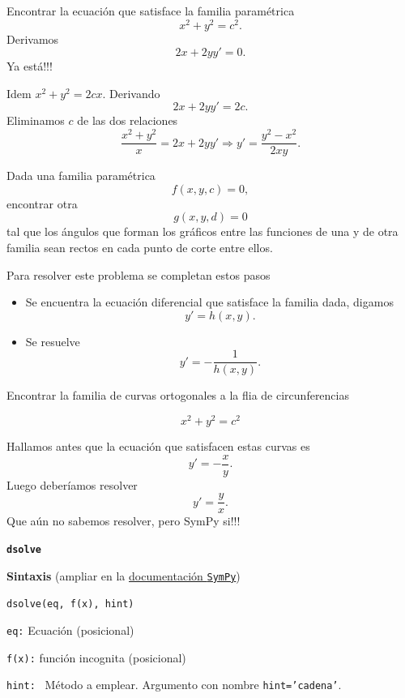 \begin{ejemplo}{} Encontrar la ecuación que satisface la familia paramétrica
\[x^2+y^2=c^2.\]
Derivamos
\[2x+2yy'=0.\]
Ya está!!!
\end{ejemplo}

\begin{ejemplo}{} Idem $x^2+y^2=2cx$.  Derivando
\[2x+2yy'=2c.\]
Eliminamos $c$ de las dos relaciones
\[\frac{x^2+y^2}{x}=2x+2yy'\Rightarrow \boxed{y'=\frac{y^2-x^2}{2xy}}.\]
\end{ejemplo}

\begin{mdframed}[style=MiEstilo]\relax%
 Dada una familia paramétrica
 \[f(x,y,c)=0,\]
 encontrar otra
 \[g(x,y,d)=0\]
 tal que los ángulos que forman los gráficos entre las funciones de una y de otra familia sean rectos  en cada punto de corte entre ellos.
\end{mdframed}




Para resolver este problema se completan estos pasos
\begin{itemize}
 \item Se encuentra la ecuación diferencial que satisface la familia dada, digamos
 \[y'=h(x,y).\]
 \item Se resuelve
 \[y'=-\frac{1}{h(x,y)}.\]
\end{itemize}




\begin{ejemplo}{} Encontrar la familia de curvas ortogonales a la flia de circunferencias

\[x^2+y^2=c^2\]

Hallamos antes que la ecuación que satisfacen estas curvas es
\[y'=-\frac{x}{y}.\]
Luego deberíamos resolver
\[y'=\frac{y}{x}.\]
Que aún no sabemos resolver,  pero SymPy si!!!

\end{ejemplo}


\begin{mdframed}[style=MiEstilo]\relax%
\textbf{\texttt{dsolve}}

\textbf{Sintaxis} (ampliar en la \href{http://docs.sympy.org/latest/modules/solvers/ode.html#}{documentación \texttt{SymPy}})

\texttt{dsolve(eq, f(x), hint)}

\texttt{eq:} Ecuación (posicional)

\texttt{f(x):} función incognita (posicional)

\texttt{hint: } Método a emplear. Argumento con nombre \texttt{hint='cadena'}.

\end{mdframed}




